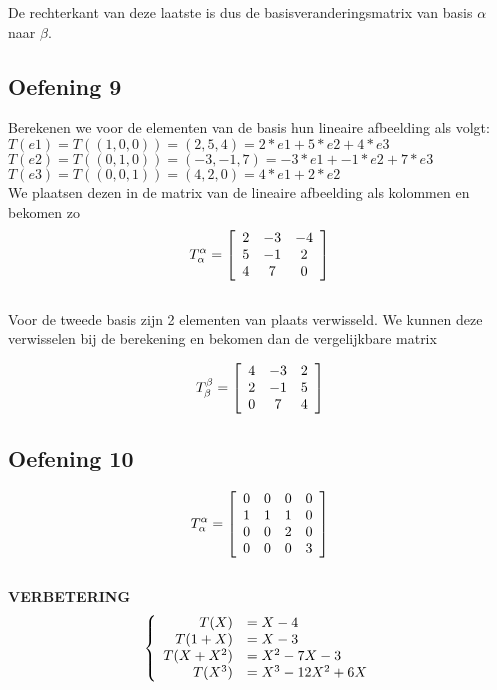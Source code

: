 \documentclass[lineaire_algebra_oplossingen.tex]{subfiles}
\begin{document}
De rechterkant van deze laatste is dus de basisveranderingsmatrix van basis $\alpha$ naar $\beta$.
\subsection{Oefening 9}

Berekenen we voor de elementen van de basis hun lineaire afbeelding als volgt:\\

$T(e1) = T( (1,0,0) ) = (2,5,4) = 2 * e1 + 5 * e2 + 4 * e3$\\

$T(e2) = T( (0,1,0) ) = (-3,-1,7) = -3 * e1 + -1 * e2 + 7 * e3$\\

$T(e3) = T( (0,0,1) ) = (4,2,0) = 4 * e1 + 2 * e2$\\

We plaatsen dezen in de matrix van de lineaire afbeelding als kolommen en bekomen zo\\

\[
T^{\alpha}_{\alpha} =
\left[
\begin{array}{c c c}
2 & -3 & -4\\
5 & -1 & 2\\
4 & 7 & 0
\end{array}
\right]
\]\\

Voor de tweede basis zijn 2 elementen van plaats verwisseld. We kunnen deze verwisselen bij de berekening en bekomen dan de vergelijkbare matrix

\[
T^{\beta}_{\beta} =
\left[
\begin{array}{c c c}
4 & -3 & 2\\
2 & -1 & 5\\
0 & 7 & 4
\end{array}
\right]
\]

\subsection{Oefening 10}

\[
T^{\alpha}_{\alpha} =
\left[
\begin{array}{c c c c}
0 & 0 & 0 & 0\\
1 & 1 & 1 & 0\\
0 & 0 & 2 & 0\\
0 & 0 & 0 & 3
\end{array}
\right]
\]\\

\textbf{VERBETERING}
\[
\left\lbrace
\begin{array}{r l}
T(X) &= X-4\\
T(1+X) &= X-3\\
T(X+X^2) &= X^2-7X-3\\
T(X^3) &= X^3-12X^2+6X\\
\end{array}
\right.
\]
\end{document}

